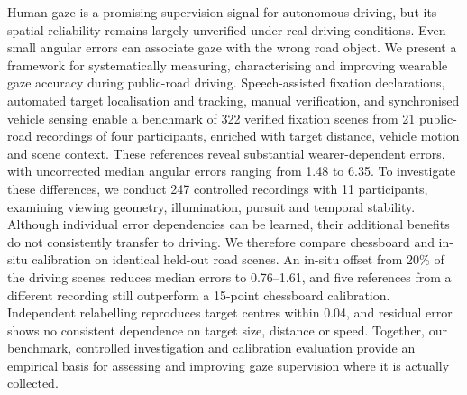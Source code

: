 Human gaze is a promising supervision signal for autonomous driving,
but its spatial reliability remains largely unverified under real
driving conditions. Even small angular errors can associate gaze
with the wrong road object. We present a framework for systematically
measuring, characterising and improving wearable gaze accuracy
during public-road driving. Speech-assisted fixation declarations,
automated target localisation and tracking, manual verification,
and synchronised vehicle sensing enable a benchmark of 322
verified fixation scenes from 21 public-road recordings of four
participants, enriched with target distance, vehicle motion and
scene context. These references reveal substantial wearer-dependent
errors, with uncorrected median angular errors ranging from
1.48\dg{} to 6.35\dg{}. To investigate these differences, we
conduct 247 controlled recordings with 11 participants, examining
viewing geometry, illumination, pursuit and temporal stability.
Although individual error dependencies can be learned, their
additional benefits do not consistently transfer to driving.
We therefore compare chessboard and in-situ calibration on
identical held-out road scenes. An in-situ offset from 20\% of the
driving scenes reduces median errors to 0.76--1.61\dg{}, and five
references from a different recording still outperform a
15-point chessboard calibration. Independent relabelling reproduces
target centres within 0.04\dg{}, and residual error shows no consistent
dependence on target size, distance or speed.
Together, our benchmark, controlled investigation and calibration
evaluation provide an empirical basis for assessing and
improving gaze supervision where it is actually collected.
